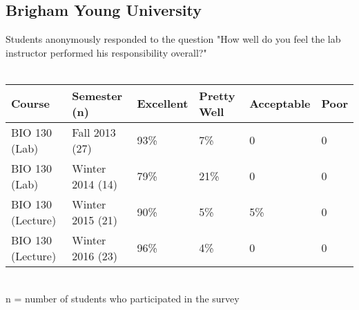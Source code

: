 \documentclass[11pt,a4paper,sans]{moderncv}        %
\begin{document}
\subsection{Brigham Young University}
{Students anonymously responded to the question "How well do you feel the lab instructor performed his responsibility overall?" }\\ \\
\begin{tabular}{ p{3cm}p{3cm}p{2cm}p{2cm}p{2cm}p{2cm}  }
 \hline
Course & Semester (n) & Excellent & Pretty Well & Acceptable & Poor \\
 \hline
 BIO 130 (Lab) & Fall 2013 (27)  & 93\%    & 7\% & 0 & 0 \\
 BIO 130 (Lab) & Winter 2014 (14) &   79\%  & 21\%  & 0 & 0 \\
 BIO 130 (Lecture) & Winter 2015 (21) & 90\% & 5\% & 5\%  & 0 \\
 BIO 130 (Lecture) & Winter 2016 (23) & 96\% & 4\% & 0 & 0 \\
 \hline
\end{tabular} \\
{\tiny{n = number of students who participated in the survey}} \par
\end{document}
